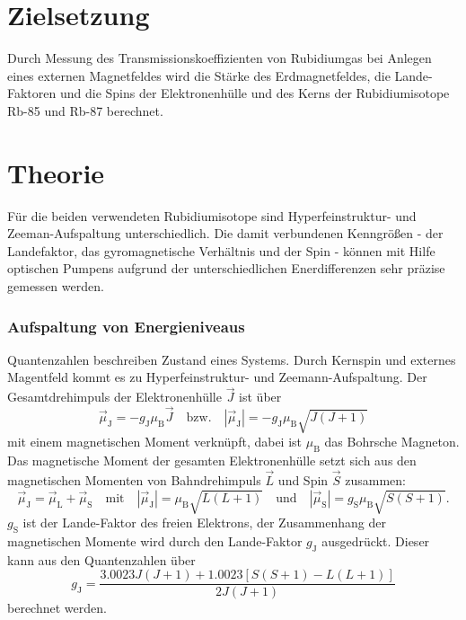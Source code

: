 \section{Zielsetzung}
Durch Messung des Transmissionskoeffizienten von Rubidiumgas bei Anlegen eines externen Magnetfeldes wird die
Stärke des Erdmagnetfeldes, die Lande-Faktoren und die Spins der Elektronenhülle und des Kerns der Rubidiumisotope
Rb-85 und Rb-87 berechnet.

\section{Theorie}

Für die beiden verwendeten Rubidiumisotope sind Hyperfeinstruktur- und Zeeman-Aufspaltung unterschiedlich. Die damit
verbundenen Kenngrößen - der Landefaktor, das gyromagnetische Verhältnis und der Spin - können mit Hilfe optischen
Pumpens aufgrund der unterschiedlichen Enerdifferenzen sehr präzise gemessen werden.

\subsubsection{Aufspaltung von Energieniveaus}

Quantenzahlen beschreiben Zustand eines Systems. Durch Kernspin und externes Magentfeld kommt es zu Hyperfeinstruktur-
und Zeemann-Aufspaltung.
Der Gesamtdrehimpuls der Elektronenhülle $\vec{J}$ ist über
\begin{equation}
  \vec{\mu}_\text{J} = -g_\text{J}\mu_\text{B}\vec{J} \quad \text{bzw.} \quad |\vec{\mu}_\text{J}| = -g_\text{J}\mu_\text{B}\sqrt{J (J + 1)}
  \label{magnMom}
\end{equation}
mit einem magnetischen Moment verknüpft, dabei ist $\mu_\text{B}$ das Bohrsche Magneton. Das magnetische Moment der gesamten
Elektronenhülle setzt sich aus den magnetischen Momenten von Bahndrehimpuls $\vec{L}$ und Spin $\vec{S}$ zusammen:
\begin{equation}
  \vec{\mu}_\text{J} = \vec{\mu}_\text{L} + \vec{\mu}_\text{S} \quad \text{mit} \quad |\vec{\mu}_\text{J}| = \mu_\text{B}\sqrt{L (L + 1)} \quad \text{und}
  \quad |\vec{\mu}_\text{S}| = g_\text{S}\mu_\text{B}\sqrt{S (S + 1)}.
\end{equation}
$g_\text{S}$ ist der Lande-Faktor des freien Elektrons, der Zusammenhang der magnetischen Momente wird durch den Lande-Faktor
$g_\text{J}$ ausgedrückt.
Dieser kann aus den Quantenzahlen über
\begin{equation}
  g_\text{J} = \frac{3.0023J(J+1) + 1.0023[S(S+1) - L(L+1)]}{2J(J+1)}
\end{equation}
berechnet werden.


